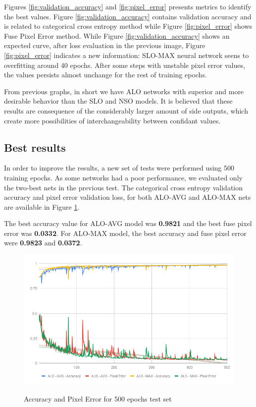 Figures \ref{fig:validation_accuracy} and \ref{fig:pixel_error} presents metrics to identify the best values. Figure \ref{fig:validation_accuracy} contains validation accuracy and is related to categorical cross entropy method while Figure \ref{fig:pixel_error} shows Fuse Pixel Error method. While Figure \ref{fig:validation_accuracy} shows an expected curve, after loss evaluation in the previous image, Figure \ref{fig:pixel_error} indicates a new information: SLO-MAX neural network seens to overfitting around 40 epochs. After some steps with unstable pixel error values, the values persists almost unchange for the rest of training epochs. 

From previous graphs, in short we have ALO networks with  superior and more desirable behavior than the SLO and NSO models. It is believed that these results are consequence of the considerably larger amount of side outputs, which create more possibilities of interchangeability between confidant values.

\subsection{Best results}

In order to improve the results, a new set of tests were performed using 500 training epochs. As some networks had a poor performance, we evaluated only the two-best nets in the previous test. The categorical cross entropy validation accuracy and pixel error validation loss, for both ALO-AVG and ALO-MAX nets are available in Figure \ref{fig:val_acc_500_epochs}.

The best accuracy value for ALO-AVG model was \textbf{0.9821} and the best fuse pixel error was \textbf{0.0332}. For ALO-MAX model, the best accuracy and fuse pixel error were \textbf{0.9823} and \textbf{0.0372}.

\begin{figure}
  \caption{Accuracy and Pixel Error for 500 epochs test set}
  \centering
  \includegraphics[width=1.\columnwidth]{figures/falreis/val_acc_500_epochs.png}
  \label{fig:val_acc_500_epochs}
\end{figure}

